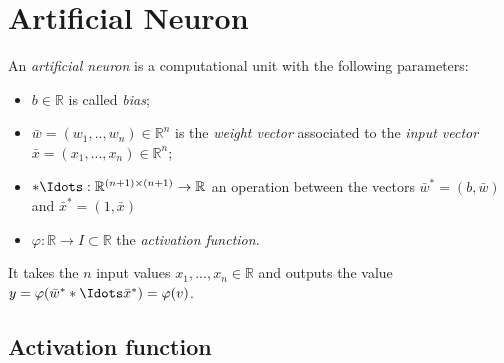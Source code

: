 \newpage
\section{Artificial Neuron} 

\begin{defn}
 An \emph{artificial neuron} is a computational unit with the following parameters:
 \begin{itemize}
  \item $b \in \mathbb{R}$ is called \emph{bias};
  \item $\bar{w}=(w_1,..,w_n) \in \mathbb{R}^n$ is the \emph{weight vector} associated to the \emph{input vector} $\bar{x}=(x_1,...,x_n) \in \mathbb{R}^n$;
  \item $ *\Idots:\mathbb{R}^{(n+1)\times(n+1)}\rightarrow\mathbb{R} $ an operation between the vectors $\bar{w}^*=(b,\bar{w})$ and $\bar{x}^*=(1,\bar{x})$
  \item $\varphi : \mathbb{R} \rightarrow I \subset \mathbb{R}$ the \emph{activation function}.
\end{itemize}
It takes the $n$ input values $x_1,...,x_n\in\mathbb{R}$ and outputs the value $y=\varphi(\bar{w}^* *\Idots \bar{x}^*)=\varphi(v)$.
\end{defn}

\subsection{Activation function}

